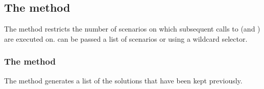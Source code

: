 \documentclass[letterpaper,10pt,english]{jupyterBook}
\begin{document}
\subsection{The  method}
\label{\detokenize{content/05_WBModels/ScenarioAnalysis:the-keep-switch-method}}
\sphinxAtStartPar
The  method restricts the number of scenarios on which subsequent calls to  (and ) are executed on.   can be passed a list of scenarios or using a wildcard selector.


\subsubsection{The  method}
\label{\detokenize{content/05_WBModels/ScenarioAnalysis:the-keep-solutions-keys-method}}
\sphinxAtStartPar
The  method generates a list of the solutions that have been kept previously.
\end{document}
